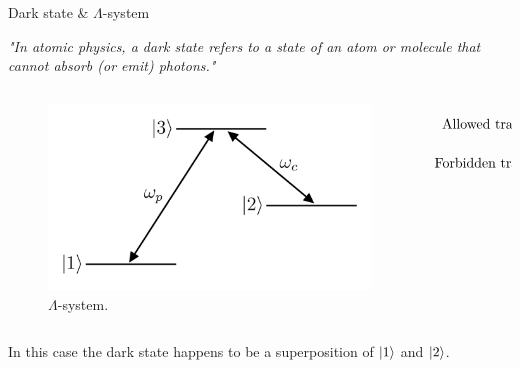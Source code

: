 \begin{frame}{Dark state \& $\Lambda$-system}

    \textit{"In atomic physics, a dark state refers to a state of an atom or molecule that cannot absorb (or emit) photons."}

    \begin{columns}[T, onlytextwidth]

        \begin{column}{0.45\textwidth}

            \begin{figure}
                \centering
                \includegraphics[width=\textwidth]{pdf/lambda-system.pdf}
                \caption{$\Lambda$-system.}
            \end{figure}

        \end{column}

        \begin{column}{0.55\textwidth}

            \vspace{30pt}

            \begin{align}
                \text{Allowed transitions:}  & \begin{cases}
                                                   \ket{1} \leftrightarrow \ket{3} \\
                                                   \ket{2} \leftrightarrow \ket{3}
                                               \end{cases} \\
                \text{Forbidden transition:} & \begin{cases}
                                                   \ket{1} \leftrightarrow \ket{2}
                                               \end{cases}
            \end{align}

        \end{column}

    \end{columns}

    \vspace{10pt}

    In this case the dark state happens to be a superposition of $\ket{1}$ and $\ket{2}$.

\end{frame}



